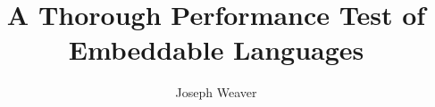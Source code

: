 \documentclass[twocolumn]{article}
\begin{document}
\title{A Thorough Performance Test of Embeddable Languages}
\author{Joseph Weaver}
\maketitle













\printbibliography


\end{document}
